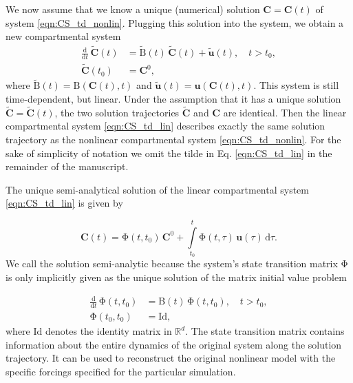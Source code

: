 \documentclass[draft]{agujournal2019}
\renewcommand{\vec}[1]{\mathbf{#1}}
\newcommand{\tens}[1]{\mathrm{#1}}
\newcommand{\id}{\tens{Id}}
\newcommand{\deriv}[1]{\frac{\mathrm{d}}{\mathrm{d}#1}}
\newcommand{\dd}[1]{\,\mathrm{d}#1}
\newcommand{\intl}{\int\limits}
\newcommand{\R}{\mathbb{R}}
\begin{document}
    We now assume that we know a unique (numerical) solution $\vec{C}=\vec{C}(t)$ of system \eqref{eqn:CS_td_nonlin}.
    Plugging this solution into the system, we obtain a new compartmental system
    \begin{equation}\label{eqn:CS_td_lin}
        \begin{aligned}
            \deriv{t}\,\widetilde{\vec{C}}(t) &= \widetilde{\tens{B}}(t)\,\widetilde{\vec{C}}(t) + \widetilde{\vec{u}}(t),\quad t>t_0,\\
            \widetilde{\vec{C}}(t_0) &= \vec{C}^0,
        \end{aligned}
    \end{equation}
    where $\widetilde{\tens{B}}(t)=\tens{B}(\vec{C}(t),t)$ and $\widetilde{\vec{u}}(t)=\vec{u}(\vec{C}(t),t)$.
    This system is still time-dependent, but linear.
    Under the assumption that it has a unique solution $\widetilde{\vec{C}}=\widetilde{\vec{C}}(t)$, the two solution trajectories $\widetilde{\vec{C}}$ and $\vec{C}$ are identical.
    Then the linear compartmental system \eqref{eqn:CS_td_lin} describes exactly the same solution trajectory as the nonlinear compartmental system \eqref{eqn:CS_td_nonlin}.
    For the sake of simplicity of notation we omit the tilde in Eq. \eqref{eqn:CS_td_lin} in the remainder of the manuscript.
    
    The unique semi-analytical solution of the linear compartmental system \eqref{eqn:CS_td_lin} is given by \cite{Brockett2015}
    
    \begin{equation*}
        \vec{C}(t) = \tens{\Phi}(t,t_0)\,\vec{C}^0 + \intl_{t_0}^t \tens{\Phi}(t,\tau)\,\vec{u}(\tau)\dd{\tau}.
    \end{equation*}
    We call the solution semi-analytic because the system's state transition matrix $\tens{\Phi}$ is only implicitly given as the unique solution of the matrix initial value problem
    
    \begin{equation*}
        \begin{aligned}
            \deriv{t}\,\tens{\Phi}(t,t_0) &= \tens{B}(t)\,\tens{\Phi}(t,t_0),\quad t>t_0,\\
            \tens{\Phi}(t_0,t_0) &= \id,
        \end{aligned}
    \end{equation*}
    where $\id$ denotes the identity matrix in $\R^d$. The state transition matrix contains information about the entire dynamics of the original system along the solution trajectory. It can be used to reconstruct the original nonlinear model with the specific forcings specified for the particular simulation. 
   
\end{document}
